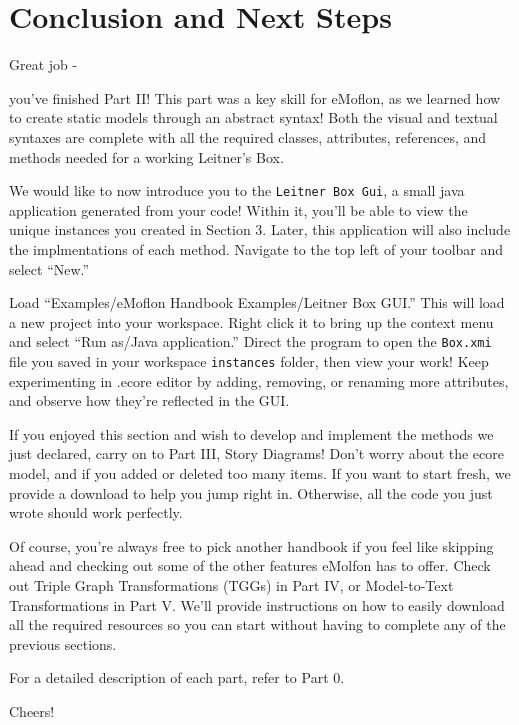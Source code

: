 \genHeader
\section{Conclusion and Next Steps}

\hypertarget{conclusion}{Great job -} you've finished Part II! This part was a key skill for eMoflon, as we learned how to create static models through an
abstract syntax! Both the visual and textual syntaxes are complete with all the required classes, attributes, references, and methods needed for a working
Leitner's Box.

We would like to now introduce you to the \texttt{Leitner Box Gui}, a small java application generated from your code! Within it, you'll be able to view the
unique instances you created in Section 3. Later, this application will also include the implmentations of each method. Navigate to the top left of your toolbar
and select ``New.''

Load ``Examples/eMoflon Handbook Examples/Leitner Box GUI.'' This will load a new project into your workspace. Right click it to bring up the context menu and
select ``Run as/Java application.'' Direct the program to open the \texttt{Box.xmi} file you saved in your workspace \texttt{instances} folder, then view your
work! Keep experimenting in .ecore editor by adding, removing, or renaming more attributes, and observe how they're reflected in the GUI.

If you enjoyed this section and wish to develop and implement the methods we just declared, carry on to Part III, Story Diagrams! Don't worry about the ecore
model, and if you added or deleted too many items. If you want to start fresh, we provide a download to help you jump right in. Otherwise, all the code you just
wrote should work perfectly.

Of course, you're always free to pick another handbook if you feel like skipping ahead and checking out some of the other features eMolfon has to offer. Check
out Triple Graph Transformations (TGGs)  in Part IV, or Model-to-Text Transformations in Part V. We'll provide instructions on how to easily download all the
required resources so you can start without having to complete any of the previous sections.

For a detailed description of each part, refer to Part 0.

Cheers!